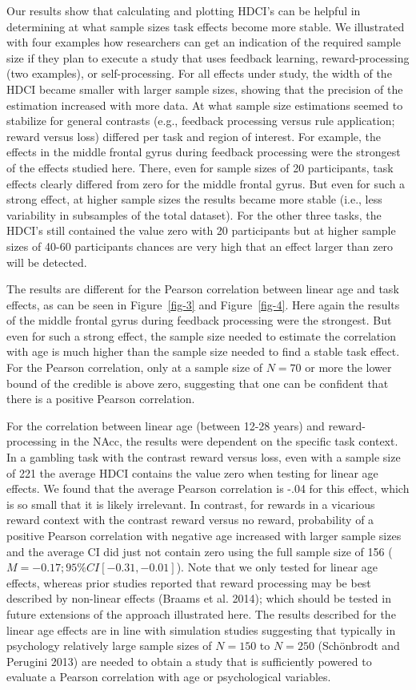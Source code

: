 \documentclass[
  letterpaper,
  DIV=11,
  numbers=noendperiod]{scrartcl}
\begin{document}
Our results show that calculating and plotting HDCI's can be helpful in
determining at what sample sizes task effects become more stable. We
illustrated with four examples how researchers can get an indication of
the required sample size if they plan to execute a study that uses
feedback learning, reward-processing (two examples), or self-processing.
For all effects under study, the width of the HDCI became smaller with
larger sample sizes, showing that the precision of the estimation
increased with more data. At what sample size estimations seemed to
stabilize for general contrasts (e.g., feedback processing versus rule
application; reward versus loss) differed per task and region of
interest. For example, the effects in the middle frontal gyrus during
feedback processing were the strongest of the effects studied here.
There, even for sample sizes of 20 participants, task effects clearly
differed from zero for the middle frontal gyrus. But even for such a
strong effect, at higher sample sizes the results became more stable
(i.e., less variability in subsamples of the total dataset). For the
other three tasks, the HDCI's still contained the value zero with 20
participants but at higher sample sizes of 40-60 participants chances
are very high that an effect larger than zero will be detected.

The results are different for the Pearson correlation between linear age
and task effects, as can be seen in Figure~\ref{fig-3} and
Figure~\ref{fig-4}. Here again the results of the middle frontal gyrus
during feedback processing were the strongest. But even for such a
strong effect, the sample size needed to estimate the correlation with
age is much higher than the sample size needed to find a stable task
effect. For the Pearson correlation, only at a sample size of \(N=70\)
or more the lower bound of the credible is above zero, suggesting that
one can be confident that there is a positive Pearson correlation.

For the correlation between linear age (between 12-28 years) and
reward-processing in the NAcc, the results were dependent on the
specific task context. In a gambling task with the contrast reward
versus loss, even with a sample size of 221 the average HDCI contains
the value zero when testing for linear age effects. We found that the
average Pearson correlation is -.04 for this effect, which is so small
that it is likely irrelevant. In contrast, for rewards in a vicarious
reward context with the contrast reward versus no reward, probability of
a positive Pearson correlation with negative age increased with larger
sample sizes and the average CI did just not contain zero using the full
sample size of 156 (\(M = -0.17; 95\% CI [-0.31, -0.01]\)). Note that we
only tested for linear age effects, whereas prior studies reported that
reward processing may be best described by non-linear effects (Braams et
al. 2014); which should be tested in future extensions of the approach
illustrated here. The results described for the linear age effects are
in line with simulation studies suggesting that typically in psychology
relatively large sample sizes of \(N=150\) to \(N=250\) (Schönbrodt and
Perugini 2013) are needed to obtain a study that is sufficiently powered
to evaluate a Pearson correlation with age or psychological variables.
\end{document}
